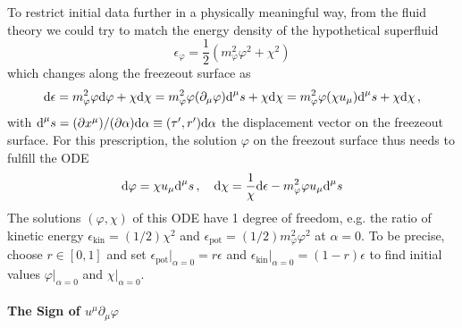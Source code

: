 To restrict initial data further in a physically meaningful way, from the fluid theory we could try to match the energy density of the hypothetical superfluid
\begin{equation}
    \epsilon_\varphi=\frac{1}{2}(m_\varphi^2\varphi^2+\chi^2)
\end{equation}
which changes along the freezeout surface as
    \begin{equation}
        \text{d}\epsilon=m_\varphi^2\varphi\text{d}\varphi+\chi\text{d}\chi=m_\varphi^2\varphi(\partial_\mu\varphi)\text{d}^\mu s+\chi\text{d}\chi=m_\varphi^2\varphi(\chi u_\mu)\text{d}^\mu s+\chi\text{d}\chi\,,
    \end{equation}
with $\text{d}^\mu s=(\partial x^\mu)/(\partial\alpha)\text{d}\alpha\equiv(\tau^\prime,r^\prime)\text{d}\alpha$ the displacement vector on the freezeout surface. For this prescription, the solution $\varphi$ on the freezout surface thus needs to fulfill the ODE
\begin{equation}
    \text{d}\varphi=\chi u_\mu\text{d}^\mu s\,,\quad
    \text{d}\chi=\frac{1}{\chi}\text{d}\epsilon-m_\varphi^2\varphi u_\mu\text{d}^\mu s
    \label{eq:InitialConditions_ODE}
\end{equation}
The solutions $(\varphi,\chi)$ of this ODE have 1 degree of freedom, e.g. the ratio of kinetic energy ${\epsilon_{\text{kin}}=(1/2)\chi^2}$ and ${\epsilon_{\text{pot}}=(1/2)m_\varphi^2\varphi^2}$ at $\alpha=0$. To be precise, choose ${r\in[0,1]}$ and set ${\epsilon_{\text{pot}}\big\vert_{\alpha=0}=r\epsilon}$ and ${\epsilon_{\text{kin}}\big\vert_{\alpha=0}=(1-r)\epsilon}$ to find initial values $\varphi\vert_{\alpha=0}$ and $\chi\vert_{\alpha=0}$.

\paragraph{The Sign of $u^\mu\partial_\mu\varphi$}

